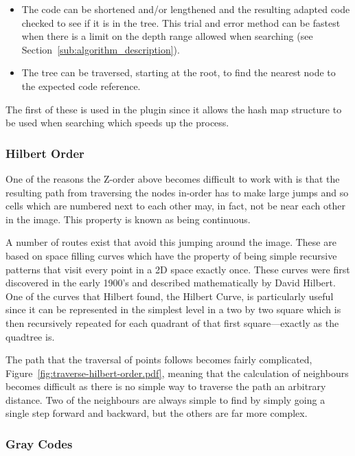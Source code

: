 \begin{itemize}
	\item The code can be shortened and/or lengthened and the resulting adapted
		code checked to see if it is in the tree. This trial and error method
		can be fastest when there is a limit on the depth range allowed when
		searching (see Section~\ref{sub:algorithm_description}).
	\item The tree can be traversed, starting at the root, to find the nearest
		node to the expected code reference.
\end{itemize}

The first of these is used in the plugin since it allows the hash map structure
to be used when searching which speeds up the process.

\subsubsection{Hilbert Order}
\label{ssub:hilbert_order}

One of the reasons the Z-order above becomes difficult to work with is that
the resulting path from traversing the nodes in-order has to make large jumps
and so cells which are numbered next to each other may, in fact, not be near
each other in the image. This property is known as being continuous.

A number of routes exist that avoid this jumping around the image. These are
based on space filling curves which have the property of being simple recursive
patterns that visit every point in a 2D space exactly once. These curves were
first discovered in the early 1900's and described mathematically by David
Hilbert\cite{hilbert1970stetige}. One of the curves that Hilbert found, the
Hilbert Curve, is particularly useful since it can be represented in the
simplest level in a two by two square which is then recursively repeated for
each quadrant of that first square---exactly as the quadtree is.

The path that the traversal of points follows becomes fairly complicated,
Figure~\ref{fig:traverse-hilbert-order.pdf}, meaning that the calculation of
neighbours becomes difficult as there is no simple way to traverse the path an
arbitrary distance. Two of the neighbours are always simple to find by simply
going a single step forward and backward, but the others are far more complex.

\subsubsection{Gray Codes}
\label{ssub:gray_codes}

